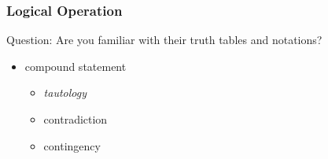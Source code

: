 \documentclass{beamer}
\begin{document}
\begin{frame}
    \frametitle{Logical Operation}
    Question: Are you familiar with their truth tables and notations?
    \begin{table}
        \centering
    \end{table}
    \begin{itemize}
        \item  compound statement
              \begin{itemize}
                  \item \itshape tautology
                  \item contradiction
                  \item contingency
              \end{itemize}
    \end{itemize}
\end{frame}
\end{document}
